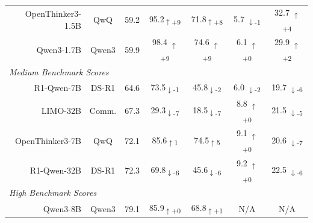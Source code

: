 \documentclass{article} %
\begin{document}
\begin{table}[t]
\begin{tabular}{r|c|c|cc|cc}
    OpenThinker3-1.5B       & QwQ & 59.2 & \cellcolor{green!29}95.2\textsubscript{$\uparrow$+9} & \cellcolor{green!28}71.8\textsubscript{$\uparrow$+8} &
    \cellcolor{red!11} 5.7 \textsubscript{$\downarrow$-1}&
    \cellcolor{green!14} 32.7 \textsubscript{$\uparrow$+4} \\

    Qwen3-1.7B              & Qwen3 & 59.9 &
    \cellcolor{green!29}98.4 \textsubscript{$\uparrow$+9} &
    \cellcolor{green!29}74.6 \textsubscript{$\uparrow$+9} &
    \cellcolor{green!0} 6.1  \textsubscript{$\uparrow$+0}&
    \cellcolor{green!12} 29.9 \textsubscript{$\uparrow$+2}\\
    \midrule
    \multicolumn{7}{l}{\textit{Medium Benchmark Scores}} \\
    \midrule

    R1-Qwen-7B      & DS-R1 & 64.6 &
    \cellcolor{red!11}73.5\textsubscript{$\downarrow$-1} &
    \cellcolor{red!12}45.8\textsubscript{$\downarrow$-2} &
    \cellcolor{red!12} 6.0 \textsubscript{$\downarrow$-2}&
    \cellcolor{red!16} 19.7 \textsubscript{$\downarrow$-6} \\

    LIMO-32B                &  Comm. & 67.3 & \cellcolor{red!27}29.3\textsubscript{$\downarrow$-7} & \cellcolor{red!27}18.5\textsubscript{$\downarrow$-7} &
    \cellcolor{green!0} 8.8 \textsubscript{$\uparrow$+0} &
    \cellcolor{red!15} 21.5 \textsubscript{$\downarrow$-5} \\

    OpenThinker3-7B         & QwQ & 72.1 & \cellcolor{green!11}85.6\textsubscript{$\uparrow$1} &
    \cellcolor{green!15}74.5\textsubscript{$\uparrow$5} &
    \cellcolor{green!0} 9.1 \textsubscript{$\uparrow$+0} &
    \cellcolor{red!27} 20.6 \textsubscript{$\downarrow$-7} \\

    R1-Qwen-32B     & DS-R1 & 72.3 & \cellcolor{red!16}69.8\textsubscript{$\downarrow$-6} & \cellcolor{red!16}45.6\textsubscript{$\downarrow$-6} &
    \cellcolor{green!0} 9.2 \textsubscript{$\uparrow$+0} &
    \cellcolor{red!16} 22.5 \textsubscript{$\downarrow$-6} \\

    \midrule
    \multicolumn{7}{l}{\textit{High Benchmark Scores}} \\
    \midrule

    Qwen3-8B                & Qwen3 & 79.1 & \cellcolor{green!0}85.9\textsubscript{$\uparrow$+0} & \cellcolor{green!11}68.8\textsubscript{$\uparrow$+1} & N/A & N/A \\


\end{tabular}
\end{table}
\end{document}
